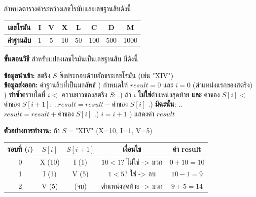 \question กำหนดตารางค่าระหว่างเลขโรมันและเลขฐานสิบดังนี้

\begin{center}
\begin{tabular}{|c|*{7}{c|}}
\hline
\textbf{เลขโรมัน} & I & V & X & L & C & D & M \\
\hline
\textbf{ค่าฐานสิบ} & 1 & 5 & 10 & 50 & 100 & 500 & 1000 \\
\hline
\end{tabular}
\end{center}

\textbf{ขั้นตอนวิธี} สำหรับแปลงเลขโรมันเป็นเลขฐานสิบ มีดังนี้

\begin{pseudocode}
\textbf{ข้อมูลนำเข้า:} สตริง $S$ ซึ่งประกอบด้วยอักขระเลขโรมัน (เช่น "XIV") \\
\textbf{ข้อมูลส่งออก:} ค่าฐานสิบที่เป็นผลลัพธ์
) กำหนดให้ $result = 0$ และ $i = 0$ (ตำแหน่งแรกของสตริง)
) \textbf{ทำซ้ำ}ตราบใดที่ $i <$ ความยาวของสตริง $S$:
\newline
.) ถ้า $i$ \textbf{ไม่ใช่}ตำแหน่งสุดท้าย \textbf{และ} ค่าของ $S[i] <$ ค่าของ $S[i+1]$:
\newline
.\quad.\qquad $result = result - \text{ค่าของ } S[i]$
\newline
.) \textbf{มิฉะนั้น}:
\newline
.\quad.\qquad $result = result + \text{ค่าของ } S[i]$
\newline
.) $i = i + 1$
) แสดงค่า $result$
\end{pseudocode}

\textbf{ตัวอย่างการทำงาน:} ถ้า $S = \text{"XIV"}$ (X=10, I=1, V=5)

\begin{center}
\begin{tabular}{|c|c|c|c|c|}
\hline
\textbf{รอบที่} ($i$) & $S[i]$ & $S[i+1]$ & \textbf{เงื่อนไข} & \textbf{ค่า result} \\
\hline
0 & X (10) & I (1) & $10 < 1$? ไม่ใช่ -> บวก & $0 + 10 = 10$ \\
1 & I (1) & V (5) & $1 < 5$? ใช่ -> ลบ & $10 - 1 = 9$ \\
2 & V (5) & (จบ) & ตำแหน่งสุดท้าย -> บวก & $9 + 5 = 14$ \\
\hline
\end{tabular}
\end{center}

